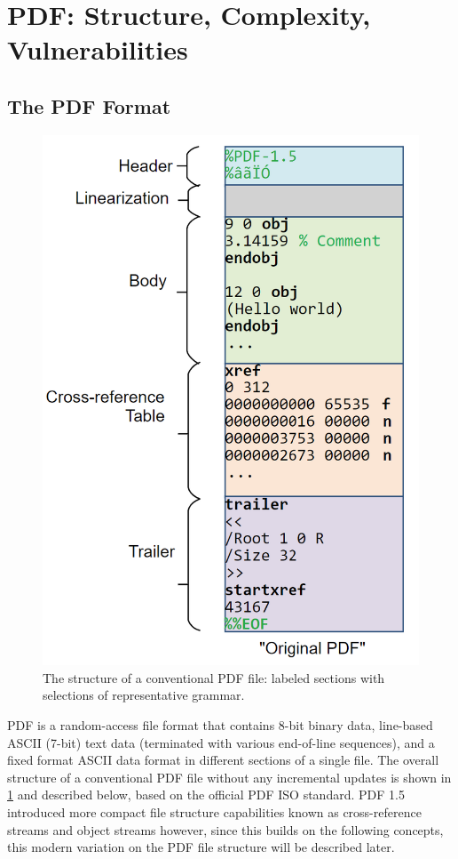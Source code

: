 \section{PDF: Structure, Complexity, Vulnerabilities}
\label{sec:pdf}

\subsection{The PDF Format}
\label{sec:pdfstructure}

\begin{figure}[t]
    \centering
    \includegraphics[width=0.65\linewidth]{figures/pdf-structure.png}
    \caption{The structure of a conventional PDF file: labeled sections with selections of representative grammar.}
    \label{fig:pdf-structure}
\end{figure}

PDF is a random-access file format that contains 8-bit binary data, line-based ASCII (7-bit)
text data (terminated with various end-of-line sequences), and a fixed format ASCII 
data format in different sections of a single file. The overall structure of a 
conventional PDF file without any incremental updates is shown in \cref{fig:pdf-structure} and 
described below, based on the official PDF ISO standard.
PDF 1.5 introduced more compact file structure capabilities known as cross-reference streams 
and object streams however, since this builds on the following concepts, this modern 
variation on the PDF file structure will be described later.

